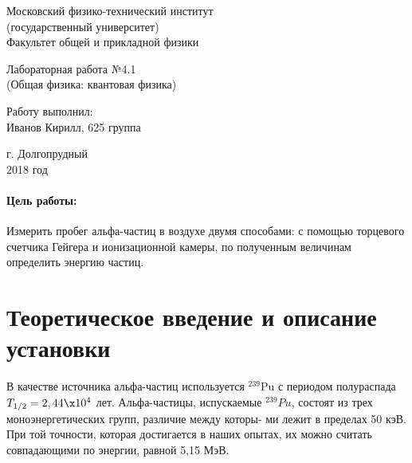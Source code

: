 \documentclass[12pt]{kiarticle}
\begin{document}
	
	\begin{titlepage}
		\begin{center}
			\large 	Московский физико-технический институт \\
			(государственный университет) \\
			Факультет общей и прикладной физики \\
			\vspace{0.2cm}
			
			\vspace{4.5cm}
			Лабораторная работа №4.1  \\ \vspace{0.2cm}
			\large (Общая физика: квантовая физика) \\ \vspace{0.2cm}
			\LARGE \textbf{   }
		\end{center}
		\vspace{2.3cm} \large
		
		\begin{center}
			Работу выполнил: \\
			Иванов Кирилл,
			625 группа
			\vspace{10mm}		
			
		\end{center}
		
		\begin{center} \vspace{60mm}
			г. Долгопрудный \\
			2018 год
		\end{center}
	\end{titlepage}


	\paragraph*{Цель работы:} Измерить пробег альфа-частиц в воздухе двумя способами: с помощью торцевого счетчика Гейгера и ионизационной камеры, по полученным величинам определить энергию частиц.
	
	
	\section{Теоретическое введение и описание установки}
	
	В качестве источника альфа-частиц используется $ ^{239}  $Pu  с периодом полураспада $ T_{1/2} = 2,44 \x 10^4 $ лет. Альфа-частицы, испускаемые $ ^{239} Pu $, состоят из трех моноэнергетических групп, различие между которы-
	ми лежит в пределах 50 кэВ. При той точности, которая достигается
	в наших опытах, их можно считать совпадающими по энергии, равной
	5,15 МэВ.
	
\end{document}

